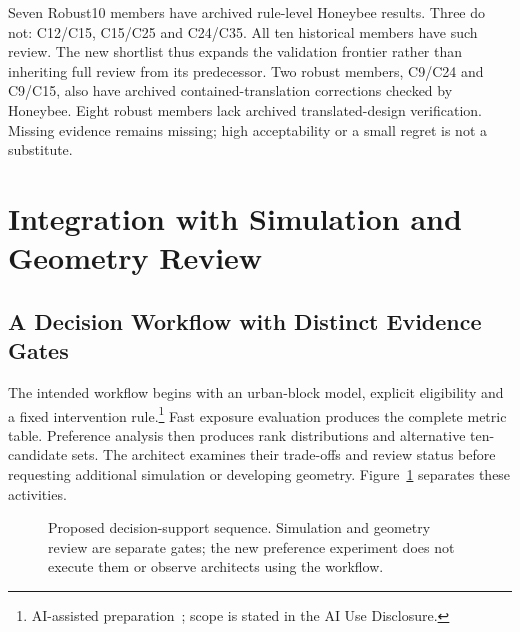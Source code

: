 \documentclass{llncs}
\newcommand{\aidraft}{\footnote{AI-assisted preparation~\cite{openai2026}; scope is stated in the AI Use Disclosure.}}
\begin{document}
Seven Robust10 members have archived rule-level Honeybee results. Three do not: C12/C15, C15/C25 and C24/C35. All ten historical members have such review. The new shortlist thus expands the validation frontier rather than inheriting full review from its predecessor. Two robust members, C9/C24 and C9/C15, also have archived contained-translation corrections checked by Honeybee. Eight robust members lack archived translated-design verification. Missing evidence remains missing; high acceptability or a small regret is not a substitute.

\section{Integration with Simulation and Geometry Review}
\subsection{A Decision Workflow with Distinct Evidence Gates}
The intended workflow begins with an urban-block model, explicit eligibility and a fixed intervention rule.\aidraft{} Fast exposure evaluation produces the complete metric table. Preference analysis then produces rank distributions and alternative ten-candidate sets. The architect examines their trade-offs and review status before requesting additional simulation or developing geometry. Figure~\ref{fig:workflow} separates these activities.

\begin{figure}[tbp]\centering
{}
\caption{Proposed decision-support sequence. Simulation and geometry review are separate gates; the new preference experiment does not execute them or observe architects using the workflow.}\label{fig:workflow}\end{figure}
\end{document}
